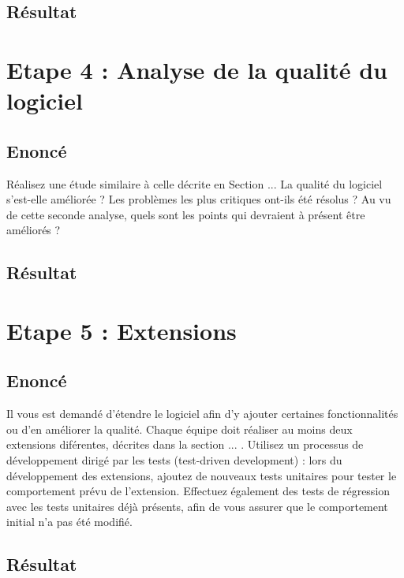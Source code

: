 \documentclass[12pt,a4paper,final]{article}
\begin{document}
\subsection{Résultat}



\section{Etape 4 : Analyse de la qualité du logiciel}\label{sec:etape4}
\subsection{Enoncé}
Réalisez une étude similaire à celle décrite en Section ... La qualité du logiciel s'est-elle améliorée ? Les problèmes les plus critiques ont-ils été résolus ? Au vu de cette seconde analyse, quels sont les points qui devraient à présent être améliorés ?
\subsection{Résultat}



\section{Etape 5 : Extensions}\label{sec:etape5}
\subsection{Enoncé} 
Il vous est demandé d'étendre le logiciel afin d'y ajouter certaines fonctionnalités ou d'en améliorer la qualité. Chaque équipe doit réaliser au moins deux extensions diférentes, décrites dans la section ... .
Utilisez un processus de développement dirigé par les tests (test-driven development) : lors du développement des extensions, ajoutez de nouveaux tests unitaires pour tester le comportement prévu de l'extension. Effectuez également des tests de régression avec les tests unitaires déjà présents, afin de vous assurer que le comportement initial n'a pas été modifié.
\subsection{Résultat}



\end{document}
